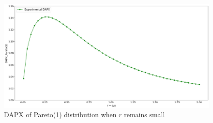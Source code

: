 \begin{figure}[H]
	\centering
	\includegraphics[width=1\textwidth]{pareto_dapx3}
	\caption{DAPX of Pareto(1) distribution when $r$ remains small}
	\label{fig:pareto_dapx3}
\end{figure}



